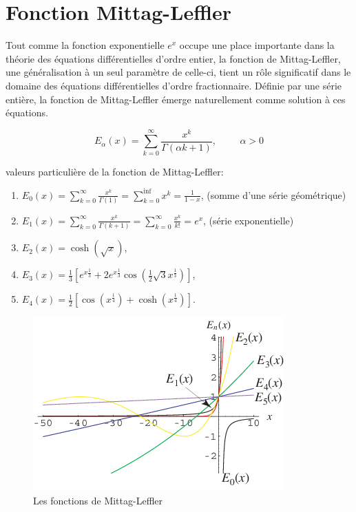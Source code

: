 \section{Fonction Mittag-Leffler}
Tout comme la fonction exponentielle $e^x$ occupe une place importante dans la théorie des équations différentielles d'ordre entier, la fonction de Mittag-Leffler, une généralisation à un seul paramètre de celle-ci, tient un rôle significatif dans le domaine des équations différentielles d'ordre fractionnaire. Définie par une série entière, la fonction de Mittag-Leffler émerge naturellement comme solution à ces équations. \cite{Mittag-Leffler}
\begin{definition}
    \begin{equation}\label{def:mittag-leffler1}
        E_{\alpha}(x) = \sum _{k=0}^{\infty} \frac{x^k}{\Gamma(\alpha k +1)}, \hspace{1cm} \alpha>0
    \end{equation}
\end{definition}
\begin{exemple}
    valeurs particulière de la fonction de Mittag-Leffler:
    \begin{enumerate}
        \item $E_0(x)=\sum_{k=0}^{\infty} \frac{x^k}{\Gamma(1)}=\sum_{k=0}^{\inf} x^k =\frac{1}{1-x}$, (somme d'une série géométrique)
        \item $E_1(x)=\sum_{k=0}^{\infty} \frac{x^k}{\Gamma(k+1)} = \sum_{k=0}^{\infty}\frac{x^k}{k!} = e^x $, (série exponentielle)
        \item $E_2(x) = \cosh(\sqrt{x})$,
        \item $E_3(x)=\frac{1}{3} \left[e^{x\frac{1}{3}} +2e^{x\frac{1}{3}} \cos(\frac{1}{2} \sqrt{3} x^{\frac{1}{3}}) \right]$,
        \item $E_4 (x) = \frac{1}{2} \left[\cos(x^{\frac{1}{4}}) + \cosh(x^{\frac{1}{4}}) \right]$.
    \end{enumerate}
\end{exemple}
\begin{figure}[H]
    \centering
    \includegraphics[scale = 0.7]{IMAGES/MittagLeffler_1001.png}
    \caption{Les fonctions de Mittag-Leffler \cite{plot:mittag-leffler}}
\end{figure}

